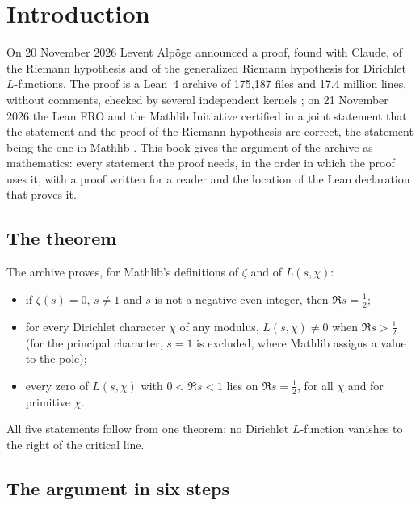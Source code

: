 \chapter*{Introduction}\label{ch:intro}

On 20 November 2026 Levent Alpöge announced a proof, found with Claude, of the Riemann hypothesis and of the generalized Riemann hypothesis for Dirichlet $L$-functions. The proof is a Lean~4 archive of 175{,}187 files and 17.4 million lines, without comments, checked by several independent kernels \cite{sutherland-2026}; on 21 November 2026 the Lean FRO and the Mathlib Initiative certified in a joint statement that the statement and the proof of the Riemann hypothesis are correct, the statement being the one in Mathlib \cite{leanfro-2026}. This book gives the argument of the archive as mathematics: every statement the proof needs, in the order in which the proof uses it, with a proof written for a reader and the location of the Lean declaration that proves it.

\section*{The theorem}

The archive proves, for Mathlib's definitions of $\zeta$ and of $L(s,\chi)$:
\begin{itemize}
\item if $\zeta(s)=0$, $s\neq1$ and $s$ is not a negative even integer, then $\Re s=\tfrac12$;
\item for every Dirichlet character $\chi$ of any modulus, $L(s,\chi)\ne0$ when $\Re s>\tfrac12$ (for the principal character, $s=1$ is excluded, where Mathlib assigns a value to the pole);
\item every zero of $L(s,\chi)$ with $0<\Re s<1$ lies on $\Re s=\tfrac12$, for all $\chi$ and for primitive $\chi$.
\end{itemize}
All five statements follow from one theorem: no Dirichlet $L$-function vanishes to the right of the critical line.

\section*{The argument in six steps}

